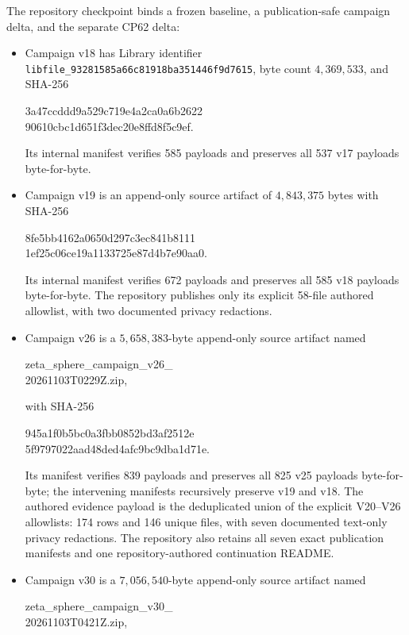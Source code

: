 \documentclass[11pt]{article}
\theoremstyle{definition}
\theoremstyle{remark}
\begin{document}
The repository checkpoint binds a frozen baseline, a publication-safe campaign
delta, and the separate CP62 delta:
\begin{itemize}[leftmargin=2em]
\item Campaign v18 has Library identifier
\texttt{libfile\_93281585a66c81918ba351446f9d7615}, byte count
$4{,}369{,}533$, and SHA-256
\begin{center}\small\ttfamily
3a47ccddd9a529c719e4a2ca0a6b2622\\
90610cbc1d651f3dec20e8ffd8f5c9ef.
\end{center}
Its internal manifest verifies 585 payloads and preserves all 537 v17 payloads
byte-for-byte.
\item Campaign v19 is an append-only source artifact of $4{,}843{,}375$ bytes
with SHA-256
\begin{center}\small\ttfamily
8fe5bb4162a0650d297c3ec841b8111\\
1ef25c06ce19a1133725e87d4b7e90aa0.
\end{center}
Its internal manifest verifies 672 payloads and preserves all 585 v18 payloads
byte-for-byte. The repository publishes only its explicit 58-file authored
allowlist, with two documented privacy redactions.
\item Campaign v26 is a $5{,}658{,}383$-byte append-only source artifact named
\begin{center}\small\ttfamily
zeta\_sphere\_campaign\_v26\_\\
20261103T0229Z.zip,
\end{center}
with SHA-256
\begin{center}\small\ttfamily
945a1f0b5bc0a3fbb0852bd3af2512e\\
5f9797022aad48ded4afc9bc9dba1d71e.
\end{center}
Its manifest verifies 839 payloads and preserves all 825 v25 payloads
byte-for-byte; the intervening manifests recursively preserve v19 and v18.
The authored evidence payload is the deduplicated union of the explicit
V20--V26 allowlists: 174 rows and 146 unique files, with seven documented
text-only privacy redactions. The repository also retains all seven exact
publication manifests and one repository-authored continuation README.
\item Campaign v30 is a $7{,}056{,}540$-byte append-only source artifact named
\begin{center}\small\ttfamily
zeta\_sphere\_campaign\_v30\_\\
20261103T0421Z.zip,
\end{center}

\end{itemize}
\end{document}
